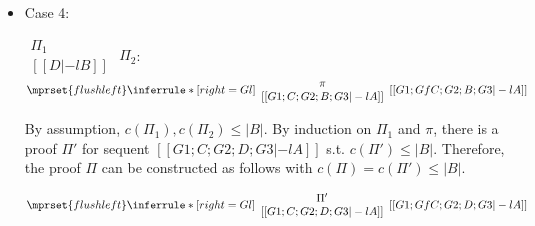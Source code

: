 \begin{itemize}
\item Case 4:
      \begin{center}
        \scriptsize
        \begin{math}
          \begin{array}{c}
            \Pi_1 \\
            {[[D |-l B]]}
          \end{array}
        \end{math}
        \qquad\qquad
        $\Pi_2$:
        \begin{math}
          $$\mprset{flushleft}
          \inferrule* [right={\tiny Gl}] {
            {
              \begin{array}{c}
                \pi \\
                {[[G1; C; G2; B; G3 |-l A]]}
              \end{array}
            }
          }{[[G1; Gf C; G2; B; G3 |-l A]]}
        \end{math}
      \end{center}
      By assumption, $c(\Pi_1),c(\Pi_2)\leq |B|$. By induction on $\Pi_1$
      and $\pi$, there is a proof $\Pi'$ for sequent
      $[[G1; C; G2; D; G3 |-l A]]$ s.t. $c(\Pi') \leq |B|$. Therefore, the
      proof $\Pi$ can be constructed as follows with
      $c(\Pi) = c(\Pi') \leq |B|$.
      \begin{center}
        \scriptsize
        \begin{math}
          $$\mprset{flushleft}
          \inferrule* [right={\tiny Gl}] {
            {
              \begin{array}{c}
                \Pi' \\
                {[[G1; C; G2; D; G3 |-l A]]}
              \end{array}
            }
          }{[[G1; Gf C; G2; D; G3 |-l A]]}
        \end{math}
      \end{center}

\end{itemize}




